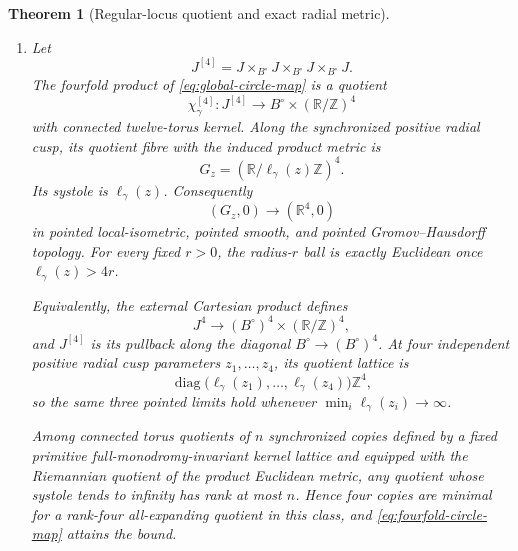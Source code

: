 \documentclass[11pt]{article}
\numberwithin{equation}{section}
\newtheorem{theorem}{Theorem}[section]
\theoremstyle{definition}
\theoremstyle{remark}
\newcommand{\R}{\mathbb R}
\newcommand{\Z}{\mathbb Z}
\begin{document}
\begin{theorem}[Regular-locus quotient and exact radial metric]
\begin{enumerate}[label=(\roman*),leftmargin=2.3em]
\item Let
\begin{equation}\label{eq:fourfold-fibre-product}
 J^{[4]}=J\times_{B^\circ}J\times_{B^\circ}J\times_{B^\circ}J.
\end{equation}
The fourfold product of \eqref{eq:global-circle-map} is a quotient
\begin{equation}\label{eq:fourfold-circle-map}
 \chi_\gamma^{[4]}:J^{[4]}\longrightarrow
 B^\circ\times(\R/\Z)^4
\end{equation}
with connected twelve-torus kernel.  Along the synchronized positive radial
cusp, its quotient fibre with the induced product metric is
\begin{equation}\label{eq:four-circle-fibre}
 G_z=(\R/\ell_\gamma(z)\Z)^4.
\end{equation}
Its systole is $\ell_\gamma(z)$.
Consequently
\begin{equation}\label{eq:four-circle-limit}
 (G_z,0)\longrightarrow(\R^4,0)
\end{equation}
in pointed local-isometric, pointed smooth, and pointed
Gromov--Hausdorff topology.  For every fixed $r>0$, the radius-$r$ ball is
exactly Euclidean once $\ell_\gamma(z)>4r$.

Equivalently, the external Cartesian product defines
\begin{equation}\label{eq:external-four-circle-map}
 J^4\longrightarrow(B^\circ)^4\times(\R/\Z)^4,
\end{equation}
and $J^{[4]}$ is its pullback along the diagonal
$B^\circ\to(B^\circ)^4$.  At four independent positive radial cusp
parameters $z_1,\ldots,z_4$, its quotient lattice is
\[
 \operatorname{diag}\bigl(\ell_\gamma(z_1),\ldots,
 \ell_\gamma(z_4)\bigr)\Z^4,
\]
so the same three pointed limits hold whenever
$\min_i\ell_\gamma(z_i)\to\infty$.

Among connected torus quotients of $n$ synchronized copies defined by a
fixed primitive full-monodromy-invariant kernel lattice and equipped with the
Riemannian quotient of the product Euclidean metric, any quotient whose
systole tends to infinity has rank at most $n$.  Hence four copies are
minimal for a rank-four all-expanding quotient in this class, and
\eqref{eq:fourfold-circle-map} attains the bound.
\end{enumerate}
\end{theorem}
\end{document}
